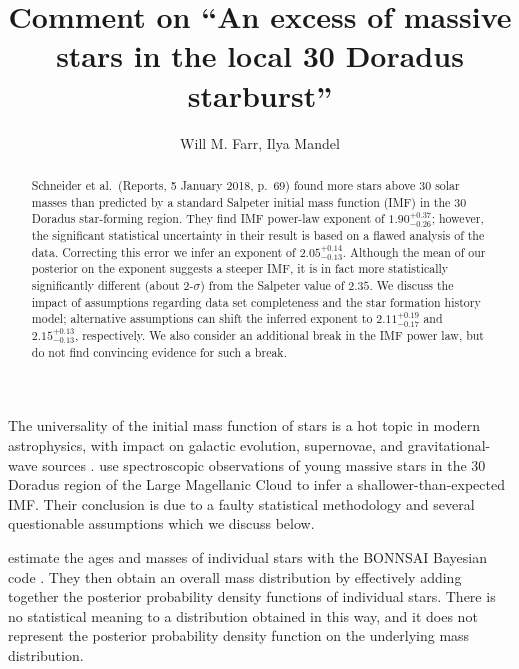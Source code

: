 \documentclass[apjl]{emulateapj}
\newcommand{\onesigrange}[3]{\ensuremath{#1^{+#2}_{-#3}}}
\newcommand{\alpharangeone}{\onesigrange{2.05}{0.14}{0.13}}
\newcommand{\alpharangethree}{\onesigrange{2.11}{0.19}{0.17}}
\newcommand{\alpharangefour}{\onesigrange{2.15}{0.13}{0.13}}
\begin{document}
\title{Comment on ``An excess of massive stars in the local 30 Doradus starburst''}

\author{Will M. Farr, Ilya Mandel}

\begin{abstract}
Schneider et al.~(Reports, 5 January 2018, p.~69) found more stars above 30 solar masses than predicted by a standard Salpeter initial mass function (IMF) in the 30 Doradus star-forming region.  They find IMF power-law exponent of $1.90^{+0.37}_{-0.26}$; however, the significant statistical uncertainty in their result is based on a flawed analysis of the data. Correcting this error we infer an exponent of $\alpharangeone$.  Although the mean of our posterior on the exponent suggests a steeper IMF, it is in fact more statistically significantly different (about 2-$\sigma$) from the Salpeter value of $2.35$.  We discuss the impact of assumptions regarding data set completeness and the star formation history model; alternative assumptions can shift the inferred exponent to $\alpharangethree$ and $\alpharangefour$, respectively.  We also consider an additional break in the IMF power law, but do not find convincing evidence for such a break.
\end{abstract}

\maketitle

The universality of the initial mass function of stars is a hot topic in modern astrophysics, with impact on galactic evolution, supernovae, and gravitational-wave sources \citep{Kroupa:2002,Bastian:2010,deMinkBelczynski:2015}.    \citet{Schneider:2018} use spectroscopic observations of young massive stars in the 30 Doradus region of the Large Magellanic Cloud to infer a shallower-than-expected IMF.  Their conclusion is due to a faulty statistical methodology and several questionable assumptions which we discuss below.

\citet{Schneider:2018} estimate the ages and masses of individual stars with the BONNSAI Bayesian code \citep{Schneider:2017}.  They then obtain an overall mass distribution by effectively adding together the posterior probability density functions of individual stars.  There is no statistical meaning to a distribution obtained in this way, and it does not represent the posterior probability density function on the underlying mass distribution.  %
\end{document}
